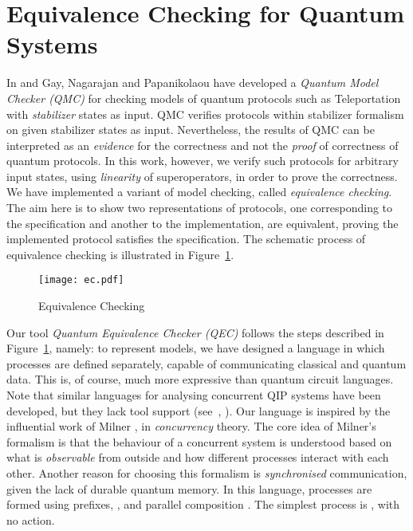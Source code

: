 \documentclass[]{llncs}
\begin{document}
\section{Equivalence Checking for Quantum Systems}
In \cite{qmc-original} and \cite{chapqmc} Gay, Nagarajan and Papanikolaou have developed a \emph{Quantum Model Checker (QMC)} for checking models of quantum protocols such as Teleportation with \emph{stabilizer} states as input. 
QMC verifies protocols within stabilizer formalism on given stabilizer states as input.
Nevertheless, the results of QMC can be interpreted as   
an \emph{evidence} for the correctness and not the \emph{proof} of correctness
of quantum protocols.
In this work, however, we verify such protocols for 
arbitrary input states, using \emph{linearity} of superoperators, in order to prove the correctness. We have implemented a  variant of model checking,
called \emph{equivalence checking}. The aim here is to show two representations of protocols, one corresponding to the specification and another to the implementation, are equivalent, proving the implemented protocol satisfies the specification.
The schematic process of equivalence checking is illustrated in Figure~\ref{fig:ec}.
\begin{figure}[hbtp]
\vspace{-7mm}
\begin{center}
\texttt{[image: ec.pdf]}
\end{center}
\vspace{-10mm}
\caption{Equivalence Checking}
\label{fig:ec}
\end{figure}
Our tool 
\emph{Quantum Equivalence Checker (QEC)} follows the steps described in Figure~\ref{fig:ec}, namely:
to represent models, we have designed a language in which processes are defined separately, capable of communicating classical and
quantum data. This is, of course, much more expressive than quantum circuit languages.
Note that similar languages for analysing concurrent QIP systems have been developed, but they lack tool support
(see~\cite{cqp}, \cite{qccs}).
Our language is inspired by the influential work of
Milner \cite{mccs}, in \emph{concurrency} theory.
The core idea of Milner's formalism is that the behaviour of a concurrent system is understood based on what is 
\emph{observable} from outside and how different processes interact with each other. Another reason for choosing this
formalism is \emph{synchronised} communication, given the lack of durable quantum memory.
In this language, processes are formed using
prefixes, , and parallel composition . The simplest process is , with no action.
\end{document}
